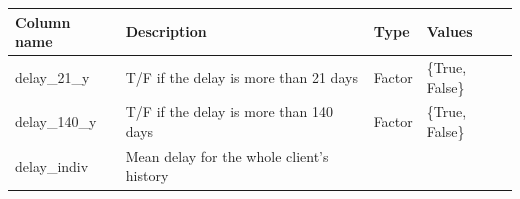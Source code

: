 \documentclass[
]{article}
\begin{document}
\begin{longtable}[]{@{}llll@{}}
\toprule
\begin{minipage}[b]{0.30\columnwidth}\raggedright
Column name\strut
\end{minipage} & \begin{minipage}[b]{0.30\columnwidth}\raggedright
Description\strut
\end{minipage} & \begin{minipage}[b]{0.11\columnwidth}\raggedright
Type\strut
\end{minipage} & \begin{minipage}[b]{0.19\columnwidth}\raggedright
Values\strut
\end{minipage}\tabularnewline
\midrule
\endhead
\begin{minipage}[t]{0.30\columnwidth}\raggedright
delay\_21\_y\strut
\end{minipage} & \begin{minipage}[t]{0.30\columnwidth}\raggedright
T/F if the delay is more than 21 days\strut
\end{minipage} & \begin{minipage}[t]{0.11\columnwidth}\raggedright
Factor\strut
\end{minipage} & \begin{minipage}[t]{0.19\columnwidth}\raggedright
\{True, False\}\strut
\end{minipage}\tabularnewline
\begin{minipage}[t]{0.30\columnwidth}\raggedright
delay\_140\_y\strut
\end{minipage} & \begin{minipage}[t]{0.30\columnwidth}\raggedright
T/F if the delay is more than 140 days\strut
\end{minipage} & \begin{minipage}[t]{0.11\columnwidth}\raggedright
Factor\strut
\end{minipage} & \begin{minipage}[t]{0.19\columnwidth}\raggedright
\{True, False\}\strut
\end{minipage}\tabularnewline
\begin{minipage}[t]{0.30\columnwidth}\raggedright
delay\_indiv\strut
\end{minipage} & \begin{minipage}[t]{0.30\columnwidth}\raggedright
Mean delay for the whole client's history\strut
\end{minipage} & \begin{minipage}[t]{0.11\columnwidth}\raggedright

\end{minipage}
\end{longtable}
\end{document}
